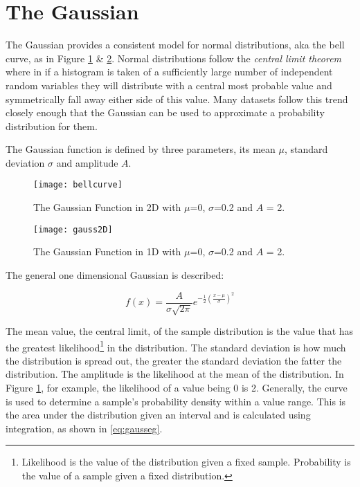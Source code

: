 \section{The Gaussian}


The Gaussian provides a consistent model for normal distributions, aka the bell curve, as in Figure \ref{fig:gauss} \& \ref{fig:gausssurf}. Normal distributions follow the \emph{central limit theorem} where in if a histogram is taken of a sufficiently large number of independent random variables they will distribute with a central most probable value and symmetrically fall away either side of this value. Many datasets follow this trend closely enough that the Gaussian can be used to approximate a probability distribution for them. 

The Gaussian function  is defined by three parameters, its mean $\mu$, standard deviation $\sigma$ and amplitude $A$.

\begin{figure}[H]
    \centering
    \centering\texttt{[image: bellcurve]}
    \caption{The Gaussian Function in 2D with $\mu$=0, $\sigma$=0.2 and $A$ = 2.}
    \label{fig:gauss}
  \end{figure}

  \begin{figure}[H]
    \centering
    \centering\texttt{[image: gauss2D]}
    \caption{The Gaussian Function in 1D with $\mu$=0, $\sigma$=0.2 and $A$ = 2.}
    \label{fig:gausssurf}
  \end{figure}

  
  
  The general one dimensional Gaussian is described:  

\begin{equation}
    f(x) = \frac{A}{\sigma\sqrt{2\pi}}e^{-\frac{1}{2}(\frac{x-\mu}{\sigma})^2}
\label{eq:gauss}
\end{equation}

  The mean value, the central limit, of the sample distribution is the value that has the greatest likelihood\footnote{Likelihood is the value of the distribution given a fixed sample. Probability is the value of a sample given a fixed distribution.} in the distribution. The standard deviation is how much the distribution is spread out, the greater the standard deviation the fatter the distribution. The amplitude is the likelihood at the mean of the distribution. In Figure \ref{fig:gauss}, for example, the likelihood of a value being 0 is 2. Generally, the curve is used to determine a sample's probability density within a value range. This is the area under the distribution given an interval and is calculated using integration, as shown in \ref{eq:gausseg}.
  
